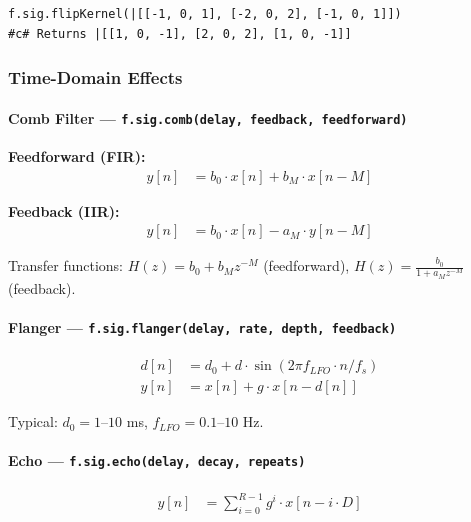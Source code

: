 \begin{verbatim}
f.sig.flipKernel(|[[-1, 0, 1], [-2, 0, 2], [-1, 0, 1]])
#c# Returns |[[1, 0, -1], [2, 0, 2], [1, 0, -1]]
\end{verbatim}

\subsubsection{Time-Domain Effects}

\paragraph{Comb Filter --- \texttt{f.sig.comb(delay, feedback, feedforward)}}

\textbf{Feedforward (FIR):}
\begin{align}
y[n] &= b_0 \cdot x[n] + b_M \cdot x[n-M] \label{eq:sig-comb-ff}
\end{align}

\textbf{Feedback (IIR):}
\begin{align}
y[n] &= b_0 \cdot x[n] - a_M \cdot y[n-M] \label{eq:sig-comb-fb}
\end{align}

Transfer functions: $H(z) = b_0 + b_M z^{-M}$ (feedforward), $H(z) = \frac{b_0}{1 + a_M z^{-M}}$ (feedback).

\paragraph{Flanger --- \texttt{f.sig.flanger(delay, rate, depth, feedback)}}

\begin{align}
d[n] &= d_0 + d \cdot \sin(2\pi f_{LFO} \cdot n / f_s) \label{eq:sig-flanger-delay} \\
y[n] &= x[n] + g \cdot x[n - d[n]] \label{eq:sig-flanger}
\end{align}

Typical: $d_0 = 1\text{--}10$ ms, $f_{LFO} = 0.1\text{--}10$ Hz.

\paragraph{Echo --- \texttt{f.sig.echo(delay, decay, repeats)}}

\begin{align}
y[n] &= \sum_{i=0}^{R-1} g^i \cdot x[n - i \cdot D] \label{eq:sig-echo}
\end{align}

